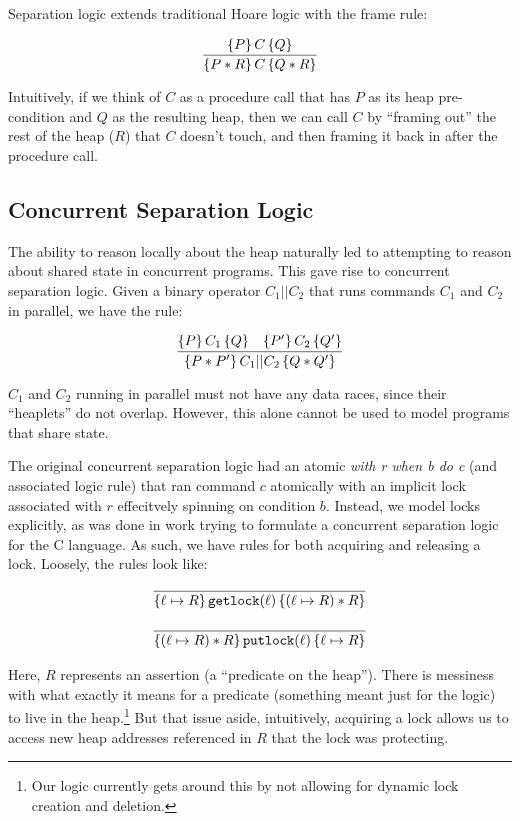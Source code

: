Separation logic extends traditional Hoare logic\cite{hoare1969axiomatic} with
the frame rule:

\[
\infer{\hoaretrip{P * R}{C}{Q * R}}{\hoaretrip{P}{C}{Q}}
\]

Intuitively, if we think of $C$ as a procedure call that has $P$ as its heap
pre-condition and $Q$ as the resulting heap, then we can call $C$ by ``framing
out'' the rest of the heap ($R$) that $C$ doesn't touch, and then framing it
back in after the procedure call.

\subsection{Concurrent Separation Logic}

The ability to reason locally about the heap naturally led to attempting to
reason about shared state in concurrent programs. This gave rise to concurrent
separation logic\cite{o2007resources}. Given a binary operator $C_1 || C_2$ that
runs commands $C_1$ and $C_2$ in parallel, we have the rule:

\[
    \infer{\hoaretrip{P * P'}{C_1 || C_2}{Q * Q'}}{\hoaretrip{P}{C_1}{Q} &
						   \hoaretrip{P'}{C_2}{Q'}}
\]

$C_1$ and $C_2$ running in parallel must not have any data races, since their
``heaplets'' do not overlap. However, this alone cannot be used to model
programs that share state.

The original concurrent separation logic had an atomic \textit{with r when b do
c} (and associated logic rule) that ran command $c$ atomically with an implicit
lock associated with $r$ effecitvely spinning on condition $b$. Instead, we
model locks explicitly, as was done in work trying to formulate a concurrent
separation logic for the C language.\cite{hobor2008oracle} As such, we have
rules for both acquiring and releasing a lock. Loosely, the rules look like:

\begin{align*}
    \infer{\hoaretrip{\ell \mapsto R}{\texttt{getlock}(\ell)}{(\ell \mapsto R) *
    R}}{} \\[+9px]
    \infer{\hoaretrip{(\ell \mapsto R) * R}{\texttt{putlock}(\ell)}{\ell \mapsto R}}{}
\end{align*}

Here, $R$ represents an assertion (a ``predicate on the heap''). There is messiness
with what exactly it means for a predicate (something meant just for the logic)
to live in the heap.\footnote{Our logic currently gets around this by not allowing for
dynamic lock creation and deletion.} But that issue aside, intuitively,
acquiring a lock allows us to access new heap addresses referenced in $R$ that the
lock was protecting.

